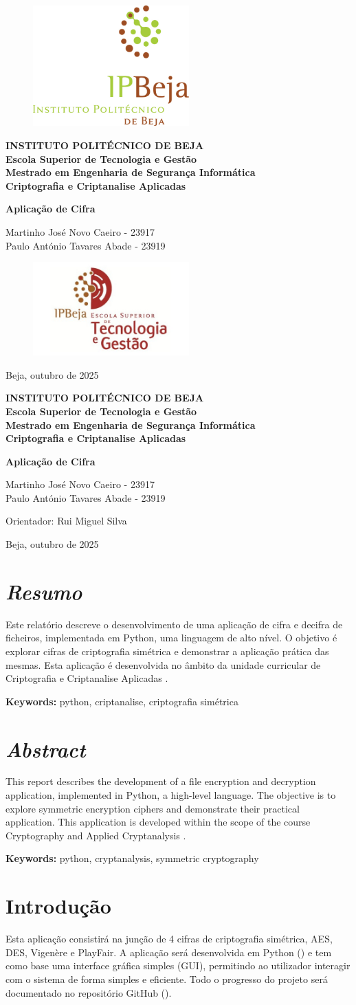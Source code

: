 \documentclass[a4paper]{article}
\newcommand{\firsttitlepage}{
    \begin{titlepage}
        \centering
        
        \begin{figure}[h!]
            \centering
            \includegraphics[width=6cm]{Recursos/Logos/LOGO_IPB.png} %
            \vspace{0.5cm}
        \end{figure}

        \large\textbf{INSTITUTO POLITÉCNICO DE BEJA} \\
        \large\textbf{Escola Superior de Tecnologia e Gestão} \\
        \large\textbf{Mestrado em Engenharia de Segurança Informática} \\
        \large\textbf{Criptografia e Criptanalise Aplicadas} \\
        
        \vspace{2cm}
        
        {\Huge \textbf{Aplicação de Cifra}} \\
        
        \vspace{1.5cm}
        
        \large Martinho José Novo Caeiro - 23917 \\
        \large Paulo António Tavares Abade - 23919 \\

        
        \vfill
        
        \begin{figure}[h!]
            \centering
            \includegraphics[width=6cm]{Recursos/Logos/IPBejaESTIG.jpg} %
        \end{figure}
        
        \vspace{1cm}
        
        {\large Beja, outubro de 2025}
    \end{titlepage}
}
\newcommand{\secondtitlepage}{
    \begin{titlepage}
        \centering
        \vspace*{1cm}
        
        \large\textbf{INSTITUTO POLITÉCNICO DE BEJA} \\
        \large\textbf{Escola Superior de Tecnologia e Gestão} \\
        \large\textbf{Mestrado em Engenharia de Segurança Informática} \\
        \large\textbf{Criptografia e Criptanalise Aplicadas} \\
        
        \vspace{2cm}
        
        {\Huge \textbf{Aplicação de Cifra}} \\
        
        \vspace{1.5cm}
        
        \large Martinho José Novo Caeiro - 23917 \\
        \large Paulo António Tavares Abade - 23919 \\

        \vspace{2cm}

        \large Orientador: Rui Miguel Silva \\
        
        \vfill
        
        {\large Beja, outubro de 2025}
    \end{titlepage}
}
\begin{document}

\firsttitlepage

\secondtitlepage


\section*{\LARGE\textbf{\textit{Resumo}}}

Este relatório descreve o desenvolvimento de uma aplicação de cifra e decifra de ficheiros, implementada em Python,
uma linguagem de alto nível. O objetivo é explorar cifras de criptografia simétrica e demonstrar a aplicação prática das mesmas.
Esta aplicação é desenvolvida no âmbito da unidade curricular de Criptografia e Criptanalise Aplicadas \cite{paglpd}.

\vspace{1cm}
\textbf{Keywords:} python, criptanalise, criptografia simétrica
\newpage

\section*{\LARGE\textbf{\textit{Abstract}}}

This report describes the development of a file encryption and decryption application, implemented in Python,
a high-level language. The objective is to explore symmetric encryption ciphers and demonstrate their practical application.
This application is developed within the scope of the course Cryptography and Applied Cryptanalysis \cite{paglpd}.

\vspace{1cm}
\textbf{Keywords:} python, cryptanalysis, symmetric cryptography


\renewcommand{\contentsname}{Índice}       %
\renewcommand{\listfigurename}{Índice de Figuras} %

\newpage
\doublespacing
\tableofcontents
\listoffigures
\doublespacing

\newpage
{}

\section{Introdução}\label{intro}
Esta aplicação consistirá na junção de 4 cifras de criptografia simétrica, AES, DES, Vigenère e PlayFair.
A aplicação será desenvolvida em Python (\cite{python}) e tem como base uma interface gráfica simples (GUI),
permitindo ao utilizador interagir com o sistema de forma simples e eficiente.
Todo o progresso do projeto será documentado no repositório GitHub (\cite{github}).
\end{document}
